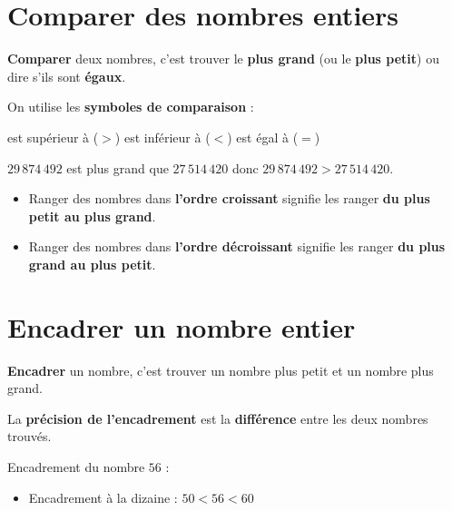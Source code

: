 \begin{pageCours} %


\section{Comparer des nombres entiers}

\begin{Def}
\textbf{Comparer} deux nombres, c'est trouver le \textbf{plus grand} (ou le \textbf{plus petit}) ou dire s'ils sont \textbf{égaux}.

On utilise les \textbf{symboles de comparaison} :
\begin{center}
est supérieur à ($>$) \hspace{1cm} est inférieur à ($<$) \hspace{1cm} est égal à ($=$)
\end{center}
\end{Def}

\begin{Ex}
$29\,874\,492$ est plus grand que $27\,514\,420$ donc $29\,874\,492>27\,514\,420$.
\end{Ex}

\begin{Def}
\begin{itemize}
\item Ranger des nombres dans \textbf{l'ordre croissant} signifie les ranger \textbf{du plus petit au plus grand}.
\item Ranger des nombres dans \textbf{l'ordre décroissant} signifie les ranger \textbf{du plus grand au plus petit}.
\end{itemize}
\end{Def}


\section{Encadrer un nombre entier}

\begin{Def}
\textbf{Encadrer} un nombre, c'est trouver un nombre plus petit et un nombre plus grand.

La \textbf{précision de l'encadrement} est la \textbf{différence} entre les deux nombres trouvés.
\end{Def}

\begin{Ex}
Encadrement du nombre $56$ :
 \begin{itemize}
\item Encadrement à la dizaine : \(50 < 56< 60\)


\end{itemize}
\end{Ex}
\end{pageCours}
